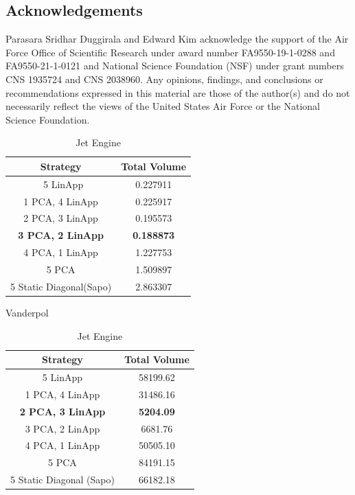 \subsection{Acknowledgements}
Parasara Sridhar Duggirala and Edward Kim acknowledge the support of the Air Force Office of Scientific Research under award number FA9550-19-1-0288 and FA9550-21-1-0121 and National Science Foundation (NSF) under grant numbers CNS 1935724 and CNS 2038960. Any opinions, findings, and conclusions or recommendations expressed in this material are those of the author(s) and do not necessarily reflect the views of the United States Air Force or the National Science Foundation.

\begin{table}[h!]
\hspace{1em}
\begin{subtable}[h]{0.45\textwidth}
     \centering
     \begin{tabular}{|c|c|}
     \hline
     Strategy & Total  Volume \\
     \hline\
     5 LinApp & 0.227911 \\
     \hline
     1 PCA, 4 LinApp& 0.225917 \\
     \hline
     2 PCA, 3 LinApp & 0.195573 \\
     \hline
     {\bf 3 PCA, 2 LinApp} & {\bf 0.188873} \\
     \hline
     4 PCA, 1 LinApp & 1.227753\\
     \hline
     5 PCA & 1.509897 \\
     \hline
     5 Static Diagonal(Sapo) & 2.863307  \\
     \hline
    \end{tabular}
    \caption{Vanderpol}
    \label{tab:vdpvol}
 \end{subtable}\hspace{1em}
 \begin{subtable}[h]{0.45\textwidth}
      \centering
      \begin{tabular}{|c|c|}
      \hline
      Strategy & Total  Volume \\
      \hline
      5 LinApp & 58199.62 \\
      \hline
      1 PCA, 4 LinApp & 31486.16 \\
      \hline
      {\bf 2 PCA, 3 LinApp} & {\bf 5204.09}\\
      \hline
      3 PCA, 2 LinApp & 6681.76 \\
      \hline
      4 PCA, 1 LinApp& 50505.10 \\
      \hline
      5 PCA  & 84191.15 \\
      \hline
      5 Static Diagonal (Sapo) & 66182.18  \\
      \hline
     \end{tabular}
     \caption{Jet Engine}
     \label{tab:enginevol}
  \end{subtable}


\end{table}

